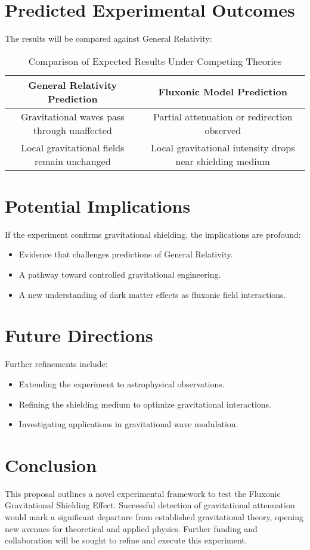 \documentclass{article}
\begin{document}
\section{Predicted Experimental Outcomes}
The results will be compared against General Relativity:
\begin{table}[ht]
    \centering
    \begin{tabular}{|c|c|}
        \hline
        \textbf{General Relativity Prediction} & \textbf{Fluxonic Model Prediction} \\
        \hline
        Gravitational waves pass through unaffected & Partial attenuation or redirection observed \\
        \hline
        Local gravitational fields remain unchanged & Local gravitational intensity drops near shielding medium \\
        \hline
    \end{tabular}
    \caption{Comparison of Expected Results Under Competing Theories}
    \label{tab:predictions}
\end{table}

\section{Potential Implications}
If the experiment confirms gravitational shielding, the implications are profound:
\begin{itemize}
    \item Evidence that challenges predictions of General Relativity.
    \item A pathway toward controlled gravitational engineering.
    \item A new understanding of dark matter effects as fluxonic field interactions.
\end{itemize}

\section{Future Directions}
Further refinements include:
\begin{itemize}
    \item Extending the experiment to astrophysical observations.
    \item Refining the shielding medium to optimize gravitational interactions.
    \item Investigating applications in gravitational wave modulation.
\end{itemize}

\section{Conclusion}
This proposal outlines a novel experimental framework to test the Fluxonic Gravitational Shielding Effect. Successful detection of gravitational attenuation would mark a significant departure from established gravitational theory, opening new avenues for theoretical and applied physics. Further funding and collaboration will be sought to refine and execute this experiment.
\end{document}
